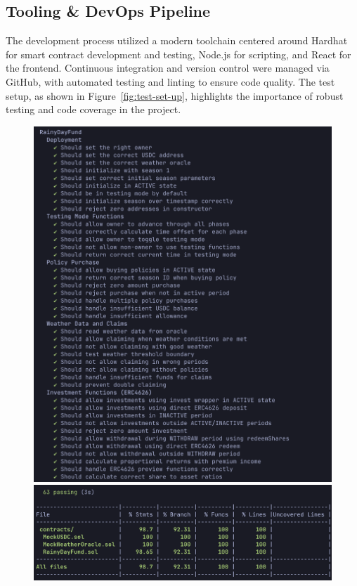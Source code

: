 \documentclass[11pt,a4paper]{article}
\begin{document}
    \subsection{Tooling \& DevOps Pipeline}\label{subsec:tooling-devops}
    The development process utilized a modern toolchain centered around Hardhat for smart contract development and testing, Node.js for scripting, and React for the frontend. Continuous integration and version control were managed via GitHub, with automated testing and linting to ensure code quality. The test setup, as shown in Figure~\ref{fig:test-set-up}, highlights the importance of robust testing and code coverage in the project.

    \begin{figure}[H]
        \centering
        \begin{minipage}[b]{0.48\textwidth}
            \centering
            \includegraphics[width=0.95\linewidth]{graphics/Passing_Tests}
            \includegraphics[width=0.95\linewidth]{graphics/Test_Coverage}

\end{minipage}
\end{figure}
\end{document}

